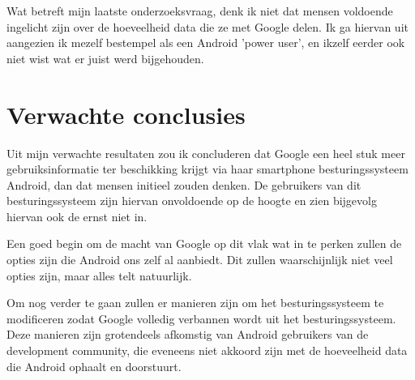 \noindent Wat betreft mijn laatste onderzoeksvraag, denk ik niet dat mensen voldoende ingelicht zijn over de hoeveelheid data die ze met Google delen. Ik ga hiervan uit aangezien ik mezelf bestempel als een Android 'power user', en ikzelf eerder ook niet wist wat er juist werd bijgehouden.


\section{Verwachte conclusies}
\label{sec:verwachte_conclusies}


Uit mijn verwachte resultaten zou ik concluderen dat Google een heel stuk meer gebruiksinformatie ter beschikking krijgt via haar smartphone besturingssysteem Android, dan dat mensen initieel zouden denken. De gebruikers van dit besturingssysteem zijn hiervan onvoldoende op de hoogte en zien bijgevolg hiervan ook de ernst niet in.

\vspace{3mm}

\noindent Een goed begin om de macht van Google op dit vlak wat in te perken zullen de opties zijn die Android ons zelf al aanbiedt. Dit zullen waarschijnlijk niet veel opties zijn, maar alles telt natuurlijk. 

\vspace{3mm}

\noindent Om nog verder te gaan zullen er manieren zijn om het besturingssysteem te modificeren zodat Google volledig verbannen wordt uit het besturingssysteem. Deze manieren zijn grotendeels afkomstig van Android gebruikers van de development community, die eveneens niet akkoord zijn met de hoeveelheid data die Android ophaalt en doorstuurt.


